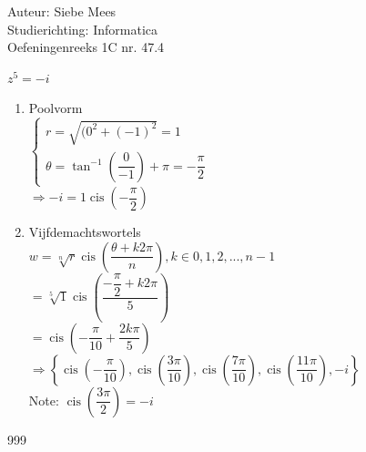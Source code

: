 \documentclass[a4paper]{article}
\newcommand{\cis}{\operatorname{cis}}
\begin{document}
  
\noindent \large Auteur: Siebe Mees \\
\noindent \large Studierichting: Informatica\\
\noindent \large Oefeningenreeks 1C nr. 47.4\\

\medskip

\normalsize

$ z^5 = -i $\\

\begin{enumerate}

\item Poolvorm \\

$ \left \{
\begin{array}{l}
    r = \sqrt{(0^2 + (-1)^2} = 1 \\
    \theta = \tan^{-1} \left( \dfrac{0}{-1} \right) + \pi = -\dfrac{\pi}{2}
\end{array}
\right .$\\ 

$ \Rightarrow -i = 1 \cis \left(- \dfrac{\pi}{2} \right) $\\

\item Vijfdemachtswortels \\

$ w = \sqrt[n]{r} \cis \left( \dfrac{\theta + k 2 \pi}{n} \right), k \in {0,1,2,..., n-1} $\\

$ = \sqrt[5]{1} \cis \left( \dfrac{- \dfrac{\pi}{2} + k 2 \pi}{5} \right) $\\

$ = \cis \left( -\dfrac{\pi}{10} + \dfrac{2k\pi}{5} \right) $\\

$ \Rightarrow \left\{  \cis \left( - \dfrac{\pi}{10} \right),  \cis \left( \dfrac{3\pi}{10} \right), \cis \left( \dfrac{7\pi}{10} \right), \cis \left( \dfrac{11\pi}{10} \right), -i \right\} $\\ 

Note: $\cis\left(\dfrac{3\pi}{2}\right)=-i $\\

\end{enumerate}


\begin{thebibliography}{999}

\end{thebibliography}
\end{document}
